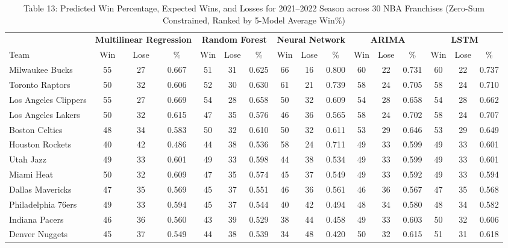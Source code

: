 \documentclass[11pt,a4paper]{article}
\begin{document}
\begin{table}[H]
\centering
\caption{Table 13: Predicted Win Percentage, Expected Wins, and Losses for 2021--2022 Season across 30 NBA Franchises (Zero-Sum Constrained, Ranked by 5-Model Average Win\%)}
\label{tab:team_table13}
\tiny
\setlength{\tabcolsep}{1.5pt}
\begin{tabular}{l ccc ccc ccc ccc ccc}
\toprule
 & \multicolumn{3}{c}{\textbf{Multilinear Regression}} & \multicolumn{3}{c}{\textbf{Random Forest}} & \multicolumn{3}{c}{\textbf{Neural Network}} & \multicolumn{3}{c}{\textbf{ARIMA}} & \multicolumn{3}{c}{\textbf{LSTM}} \\
\cmidrule(lr){2-4} \cmidrule(lr){5-7} \cmidrule(lr){8-10} \cmidrule(lr){11-13} \cmidrule(lr){14-16}
Team & Win & Lose & \% & Win & Lose & \% & Win & Lose & \% & Win & Lose & \% & Win & Lose & \% \\
\midrule
Milwaukee Bucks & 55 & 27 & 0.667 & 51 & 31 & 0.625 & 66 & 16 & 0.800 & 60 & 22 & 0.731 & 60 & 22 & 0.737 \\
Toronto Raptors & 50 & 32 & 0.606 & 52 & 30 & 0.630 & 61 & 21 & 0.739 & 58 & 24 & 0.705 & 58 & 24 & 0.710 \\
Los Angeles Clippers & 55 & 27 & 0.669 & 54 & 28 & 0.658 & 50 & 32 & 0.609 & 54 & 28 & 0.658 & 54 & 28 & 0.662 \\
Los Angeles Lakers & 50 & 32 & 0.615 & 47 & 35 & 0.576 & 46 & 36 & 0.565 & 58 & 24 & 0.702 & 58 & 24 & 0.707 \\
Boston Celtics & 48 & 34 & 0.583 & 50 & 32 & 0.610 & 50 & 32 & 0.611 & 53 & 29 & 0.646 & 53 & 29 & 0.649 \\
Houston Rockets & 40 & 42 & 0.486 & 44 & 38 & 0.536 & 58 & 24 & 0.711 & 49 & 33 & 0.599 & 49 & 33 & 0.601 \\
Utah Jazz & 49 & 33 & 0.601 & 49 & 33 & 0.598 & 44 & 38 & 0.534 & 49 & 33 & 0.599 & 49 & 33 & 0.601 \\
Miami Heat & 50 & 32 & 0.609 & 47 & 35 & 0.574 & 45 & 37 & 0.549 & 49 & 33 & 0.592 & 49 & 33 & 0.594 \\
Dallas Mavericks & 47 & 35 & 0.569 & 45 & 37 & 0.551 & 46 & 36 & 0.561 & 46 & 36 & 0.567 & 47 & 35 & 0.568 \\
Philadelphia 76ers & 49 & 33 & 0.594 & 45 & 37 & 0.544 & 40 & 42 & 0.494 & 48 & 34 & 0.580 & 48 & 34 & 0.582 \\
Indiana Pacers & 46 & 36 & 0.560 & 43 & 39 & 0.529 & 38 & 44 & 0.458 & 49 & 33 & 0.603 & 50 & 32 & 0.606 \\
Denver Nuggets & 45 & 37 & 0.549 & 44 & 38 & 0.539 & 34 & 48 & 0.420 & 50 & 32 & 0.615 & 51 & 31 & 0.618 \\

\end{tabular}
\end{table}
\end{document}
